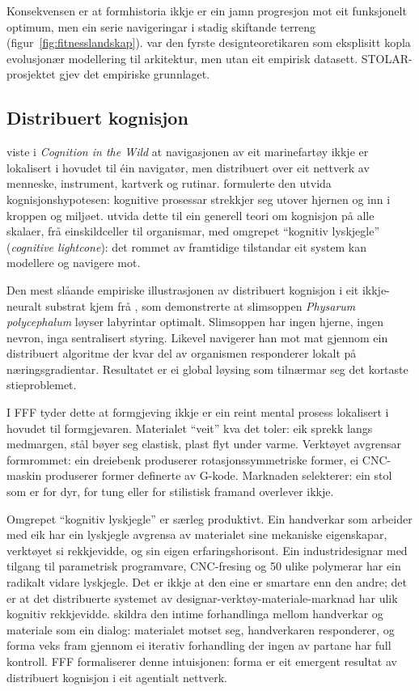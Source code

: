 \documentclass[10pt, a4paper, twocolumn]{article}
\begin{document}
Konsekvensen er at formhistoria ikkje er ein jamn progresjon mot eit funksjonelt optimum, men ein serie navigeringar i stadig skiftande terreng (figur~\ref{fig:fitnesslandskap}). \citet{frazer1995} var den fyrste designteoretikaren som eksplisitt kopla evolusjonær modellering til arkitektur, men utan eit empirisk datasett. STOLAR-prosjektet gjev det empiriske grunnlaget.

\subsection{Distribuert kognisjon}

\citet{hutchins1995} viste i \textit{Cognition in the Wild} at navigasjonen av eit marinefartøy ikkje er lokalisert i hovudet til éin navigatør, men distribuert over eit nettverk av menneske, instrument, kartverk og rutinar. \citet{clark2008} formulerte den utvida kognisjonshypotesen: kognitive prosessar strekkjer seg utover hjernen og inn i kroppen og miljøet. \citet{levin2019} utvida dette til ein generell teori om kognisjon på alle skalaer, frå einskildceller til organismar, med omgrepet ``kognitiv lyskjegle'' (\textit{cognitive lightcone}): det rommet av framtidige tilstandar eit system kan modellere og navigere mot.

Den mest slåande empiriske illustrasjonen av distribuert kognisjon i eit ikkje-neuralt substrat kjem frå \citet{nakagaki2000}, som demonstrerte at slimsoppen \textit{Physarum polycephalum} løyser labyrintar optimalt. Slimsoppen har ingen hjerne, ingen nevron, inga sentralisert styring. Likevel navigerer han mot mat gjennom ein distribuert algoritme der kvar del av organismen responderer lokalt på næringsgradientar. Resultatet er ei global løysing som tilnærmar seg det kortaste stieproblemet.

I FFF tyder dette at formgjeving ikkje er ein reint mental prosess lokalisert i hovudet til formgjevaren. Materialet ``veit'' kva det toler: eik sprekk langs medmargen, stål bøyer seg elastisk, plast flyt under varme. Verktøyet avgrensar formrommet: ein dreiebenk produserer rotasjonssymmetriske former, ei CNC-maskin produserer former definerte av G-kode. Marknaden selekterer: ein stol som er for dyr, for tung eller for stilistisk framand overlever ikkje.

Omgrepet ``kognitiv lyskjegle'' \citep{levin2019} er særleg produktivt. Ein handverkar som arbeider med eik har ein lyskjegle avgrensa av materialet sine mekaniske eigenskapar, verktøyet si rekkjevidde, og sin eigen erfaringshorisont. Ein industridesignar med tilgang til parametrisk programvare, CNC-fresing og 50 ulike polymerar har ein radikalt vidare lyskjegle. Det er ikkje at den eine er smartare enn den andre; det er at det distribuerte systemet av designar-verktøy-materiale-marknad har ulik kognitiv rekkjevidde. \citet{sennett2008} skildra den intime forhandlinga mellom handverkar og materiale som ein dialog: materialet motset seg, handverkaren responderer, og forma veks fram gjennom ei iterativ forhandling der ingen av partane har full kontroll. FFF formaliserer denne intuisjonen: forma er eit emergent resultat av distribuert kognisjon i eit agentialt nettverk.
\end{document}
